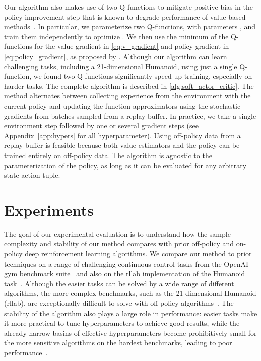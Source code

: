 \documentclass{article}
\newcommand{\aref}[1]{\hyperref[#1]{Appendix~\ref*{#1}}}
\begin{document}
Our algorithm also makes use of two Q-functions to mitigate  positive bias in the policy improvement step that is known to degrade performance of value based methods~\citep{hasselt2010double,fujimoto2018addressing}. In particular, we parameterize two Q-functions, with parameters , and train them independently to optimize . We then use the minimum of the Q-functions for the value gradient in \autoref{eq:v_gradient} and policy gradient in \autoref{eq:policy_gradient}, as proposed by \citet{fujimoto2018addressing}. Although our algorithm can learn challenging tasks, including a 21-dimensional Humanoid, using just a single Q-function, we found two Q-functions significantly speed up training, especially on harder tasks. The complete algorithm is described in \autoref{alg:soft_actor_critic}. The method alternates between collecting experience from the environment with the current policy and updating the function approximators using the stochastic gradients from batches sampled from a replay buffer. In practice, we take a single environment step followed by one or several gradient steps (see \aref{app:hypers} for all hyperparameter). Using off-policy data from a replay buffer is feasible because both value estimators and the policy can be trained entirely on off-policy data. The algorithm is agnostic to the parameterization of the policy, as long as it can be evaluated for any arbitrary state-action tuple.




\section{Experiments}
\label{sec:experiments}

The goal of our experimental evaluation is to understand how the sample complexity and stability of our method compares with prior off-policy and on-policy deep reinforcement learning algorithms. We compare our method to prior techniques on a range of challenging continuous control tasks from the OpenAI gym benchmark suite~\citep{brockman2016openai} and also on the rllab implementation of the Humanoid task~\citep{duan2016benchmarking}. Although the easier tasks can be solved by a wide range of different algorithms, the more complex benchmarks, such as the 21-dimensional Humanoid (rllab), are exceptionally difficult to solve with off-policy algorithms~\citep{duan2016benchmarking}. The stability of the algorithm also plays a large role in performance: easier tasks make it more practical to tune hyperparameters to achieve good results, while the already narrow basins of effective hyperparameters become prohibitively small for the more sensitive algorithms on the hardest benchmarks, leading to poor performance~\citep{gu2016q}. 
\end{document}
